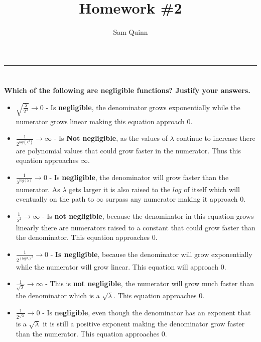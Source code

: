 \documentclass[letterpaper,12pt,notitlepage,fleqn]{article}
\title{Homework \#2}
\author{Sam Quinn}
\begin{document}
\maketitle
\hrule

\section{}
\textbf{Which of the following are negligible functions? Justify your answers.}
\begin{itemize}
	\item $\sqrt{\frac{\lambda}{2^{\lambda}}} \rightarrow 0$ - Is \textbf{negligible}, the denominator grows exponentially while the numerator grows linear making this equation approach $0$.
	\item $\frac{1}{2^{log(\lambda^{2})}} \rightarrow \infty$ - Is \textbf{Not negligible}, as the values of $\lambda$ continue to increase there are polynomial values that could grow faster in the numerator. Thus this equation approaches $\infty$.
	\item $\frac{1}{\lambda^{log(\lambda)}} \rightarrow 0$ - Is \textbf{negligible}, the denominator will grow faster than the numerator. As $\lambda$ gets larger it is also raised to the $log$ of itself which will eventually on the path to $\infty$ surpass any numerator making it approach $0$.
	\item $\frac{1}{\lambda^{2}} \rightarrow \infty$ - Is \textbf{not negligible}, because the denominator in this equation grows linearly there are numerators raised to a constant that could grow faster than the denominator. This equation approaches $0$.
	\item $\frac{1}{2^{(log\lambda)^{2}}} \rightarrow 0$ - \textbf{Is negligible}, because the denominator will grow exponentially while the numerator will grow linear. This equation will approach $0$.
	\item $\frac{1}{\sqrt{\lambda}} \rightarrow \infty$ - This is \textbf{not negligible}, the numerator will grow much faster than the denominator which is a $\sqrt{\lambda}$. This equation approaches $0$.
	\item $\frac{1}{2^{\sqrt{\lambda}}} \rightarrow 0$ - Is \textbf{negligible}, even though the denominator has an exponent that is a $\sqrt{\lambda}$ it is still a positive exponent making the denominator grow faster than the numerator. This equation approaches $0$.
\end{itemize}
\end{document}
